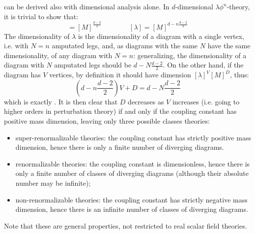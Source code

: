  can be derived also with dimensional analysis alone. In $ d $-dimensional $ \lambda \phi^n $-theory, it is trivial to show that:
\begin{equation*}
  [\phi] = [M]^{\frac{d - 2}{2}}
  \qquad \qquad
  [\lambda] = [M]^{d - n \frac{d - 2}{2}}
\end{equation*}
The dimensionality of $ \lambda $ is the dimensionality of a diagram with a single vertex, i.e. with $ N = n $ amputated legs, and, as diagrams with the same $ N $ have the same dimensionality, of any diagram with $ N = n $: generalizing, the dimensionality of a diagram with $ N $ amputated legs should be $ d - N \frac{d - 2}{2} $. On the other hand, if the diagram has $ V $ vertices, by definition it should have dimension $ [\lambda]^V [M]^D $, thus:
\begin{equation*}
  \left( d - n \frac{d - 2}{2} \right) V + D = d - N \frac{d - 2}{2}
\end{equation*}
which is exactly . It is then clear that $ D $ decreases as $ V $ increases (i.e. going to higher orders in perturbation theory) if and only if the coupling constant has positive mass dimension, leaving only three possible classes theories:
\begin{itemize}
  \item super-renormalizable theories: the coupling constant has strictly positive mass dimension, hence there is only a finite number of diverging diagrams.
  \item renormalizable theories: the coupling constant is dimensionless, hence there is only a finite number of classes of diverging diagrams (although their absolute number may be infinite);
  \item non-renormalizable theories: the coupling constant has strictly negative mass dimension, hence there is an infinite number of classes of diverging diagrams.
\end{itemize}
Note that these are general properties, not restricted to real scalar field theories.

